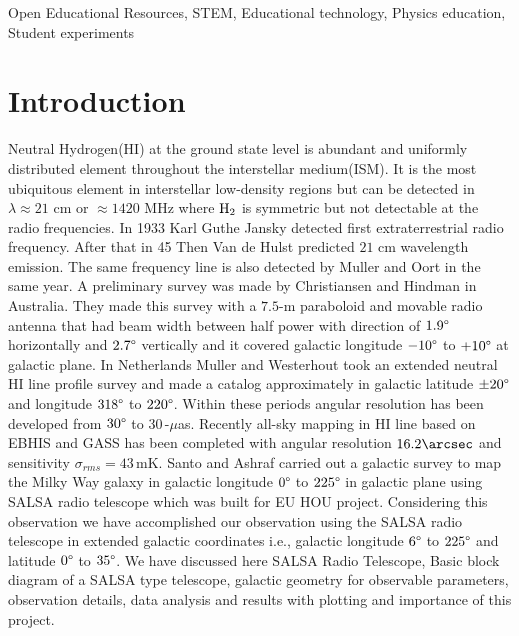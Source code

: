 \documentclass[conference]{IEEEtran}
\begin{document}
\begin{IEEEkeywords}
Open Educational Resources, STEM, Educational technology, Physics education, Student experiments
\end{IEEEkeywords}

\section{Introduction}
Neutral Hydrogen(HI) at the ground state level is abundant and uniformly distributed element throughout the interstellar medium(ISM). It is the most ubiquitous element in interstellar  low-density regions but can be detected in $\lambda\approx21$ cm or $\approx1420$ MHz where $\textnormal{H}_2$ is symmetric but not detectable at the radio frequencies\cite{HI2016}. In 1933 Karl Guthe Jansky detected first extraterrestrial radio frequency\cite{jansky1933radio}. After that in 45 Then Van de Hulst predicted $21$ cm wavelength emission\cite{CJBakker1945}. The same frequency line is also detected by Muller and Oort\cite{muller1951observation} in the same year. A preliminary survey was made by Christiansen and Hindman\cite{christiansen1952preliminary} in Australia. They made this survey with a $7.5$\textnormal{-m} paraboloid and movable radio antenna that had beam width between half power with direction of $1.9\degree$ horizontally and $2.7\degree$ vertically and it covered galactic longitude $-10\degree$ to $+10\degree$ at galactic plane. In Netherlands Muller and Westerhout\cite{Muller1957} took an extended neutral HI line profile survey and made a catalog approximately in galactic latitude $\pm20\degree$ and longitude $318\degree$ to $220\degree$. Within these periods angular resolution has been developed from $30\degree$ to $30$\,-$\mu$as\cite{kellermann2001development,Middelberg2008}. Recently all-sky mapping in HI line based on EBHIS and GASS has been completed\cite{bekhti2016hi4pi} with angular resolution $16.2\arcsec$ and sensitivity $\sigma_{rms}=43$\,mK. Santo and Ashraf carried out a galactic survey to map the Milky Way galaxy in galactic longitude $0\degree$ to $225\degree$ in galactic plane\cite{santo2013mapping} using SALSA radio telescope which was built for EU HOU project\cite{Doran2007}. Considering this observation we have accomplished our observation using the SALSA radio telescope in extended galactic coordinates i.e., galactic longitude $6\degree$ to $225\degree$ and latitude $0\degree$ to $35\degree$. We have discussed here SALSA Radio Telescope, Basic block diagram of a SALSA type telescope, galactic geometry for observable parameters, observation details, data analysis and results with plotting and importance of this project.
\end{document}
